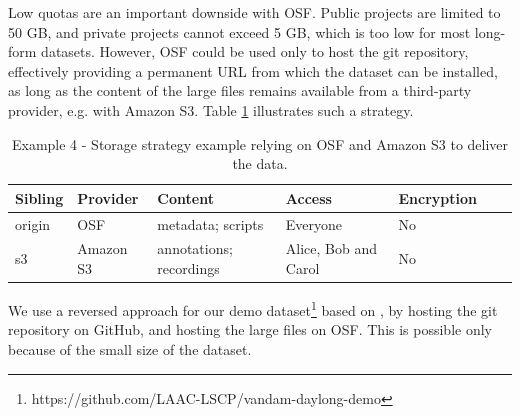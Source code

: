 \documentclass[smallextended]{svjour3}       %
\begin{document}
Low quotas are an important downside with OSF. Public projects are limited to 50 GB, and private projects cannot exceed 5 GB, which is too low for most long-form datasets.
However, OSF could be used only to host the git repository, effectively providing a permanent URL from which the dataset can be installed, as long as the content of the large files remains available from a third-party provider, e.g. with Amazon S3. Table \ref{table:storage4} illustrates such a strategy.

\begin{table}[!htbp]
\centering
\begin{tabular}{@{}lllllll@{}}
\toprule
\textbf{Sibling} & \textbf{Provider} & \textbf{Content} & \textbf{Access} & \textbf{Encryption} \\ \midrule
origin   & OSF     & metadata; scripts & Everyone & No  \\
s3 & Amazon S3  & annotations; recordings & Alice, Bob and Carol  & No \\ \bottomrule
\end{tabular}
\caption{\label{table:storage4}Example 4 - Storage strategy example relying on OSF and Amazon S3 to deliver the data.}
\end{table}

We use a reversed approach for our demo dataset\footnote{https://github.com/LAAC-LSCP/vandam-daylong-demo} based on  \citep{vandam-day}, by hosting the git repository on GitHub, and hosting the large files on OSF. This is possible only because of the small size of the dataset.



\end{document}
